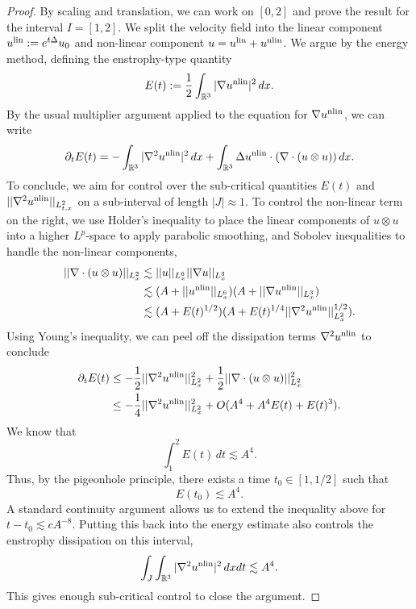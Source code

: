 \begin{proof}
	By scaling and translation, we can work on $[0, 2]$ and prove the result for the interval $I = [1, 2]$. We split the velocity field into the linear component $u^{\mathrm{lin}} := e^{t \Delta} u_0$ and non-linear component $u = u^{\mathrm{lin}} + u^{\mathrm{nlin}}$.	We argue by the energy method, defining the enstrophy-type quantity
		\[
			E(t)
				:= \frac12 \int_{\mathbb R^3} |\nabla u^{\mathrm{nlin}} |^2 \, dx.
		\]
	By the usual multiplier argument applied to the equation for $\nabla u^{\mathrm{nlin}}$, we can write
		\[
			\partial_t E(t)
				= - \int_{\mathbb R^3} |\nabla^2 u^{\mathrm{nlin}}|^2 \, dx + \int_{\mathbb R^3} \Delta u^{\mathrm{nlin}} \cdot (\nabla \cdot (u \otimes u))\, dx.
 		\]
 	To conclude, we aim for control over the sub-critical quantities $E(t)$ and $||\nabla^2 u^{\mathrm{nlin}}||_{L^2_{t, x}}$ on a sub-interval of length $|J| \approx 1$. To control the non-linear term on the right, we use Holder's inequality to place the linear components of $u \otimes u$ into a higher $L^p$-space to apply parabolic smoothing, and Sobolev inequalities to handle the non-linear components, 
 		 \begin{align*}
 			||\nabla \cdot (u \otimes u)||_{L^2_x}
 					&\lesssim ||u||_{L^6_x} ||\nabla u||_{L^3_x}\\
 					&\lesssim (A + ||u^{\mathrm{nlin}}||_{L^6_x} ) (A + ||\nabla u^{\mathrm{nlin}} ||_{L^3_x}) \\
 					&\lesssim (A + E(t)^{1/2} ) (A +E(t)^{1/4} ||\nabla^2 u^{\mathrm{nlin}}||_{L^2_x}^{1/2}).
 		\end{align*}
 	Using Young's inequality, we can peel off the dissipation terms $\nabla^2 u^{\mathrm{nlin}}$ to conclude
 		\begin{align*}
 			\partial_t E(t)
 				&\leq - \frac12 ||\nabla^2 u^{\mathrm{nlin}}||_{L^2_x}^2 + \frac12 ||\nabla \cdot (u \otimes u)||_{L^2_x}^2\\
 				&\leq - \frac14||\nabla^2 u^{\mathrm{nlin}}||_{L^2_x}^2  + O(A^4 + A^4 E(t) + E(t)^3).
 		\end{align*}
 	We know that 
 		\[
 			\int_1^2 E(t) \, dt \lesssim A^4.
 		\]
 	Thus, by the pigeonhole principle, there exists a time $t_0 \in [1, 1/2]$ such that 
 		\[
 			E(t_0) \lesssim A^4.
 		\]	
 	A standard continuity argument allows us to extend the inequality above for $t - t_0 \lesssim cA^{-8}$. Putting this back into the energy estimate also controls the enstrophy dissipation on this interval, 
 		\[
 			\int_J \int_{\mathbb R^3} |\nabla^2 u^{\mathrm{nlin}}|^2 \, dx dt \lesssim A^4.
 		\]
 	This gives enough sub-critical control to close the argument. 	
\end{proof}


